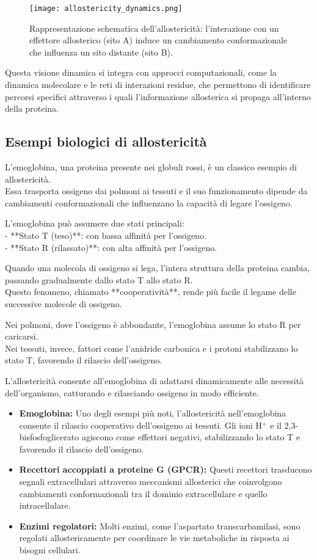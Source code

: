 \documentclass[Lau,binding=0.6cm,oneside,noexaminfo]{sapthesis}
\begin{document}
\begin{figure}[h!]
    \centering
    \texttt{[image: allostericity\_dynamics.png]}
    \caption{Rappresentazione schematica dell’allostericità: l’interazione con un effettore allosterico (sito A) induce un cambiamento conformazionale che influenza un sito distante (sito B).}
    \label{fig:allostericity}
\end{figure}

Questa visione dinamica si integra con approcci computazionali, come la dinamica molecolare e le reti di interazioni residue, che permettono di identificare percorsi specifici attraverso i quali l’informazione allosterica si propaga all’interno della proteina.

\subsection*{Esempi biologici di allostericità}
L’emoglobina, una proteina presente nei globuli rossi, è un classico esempio di allostericità. \\
Essa trasporta ossigeno dai polmoni ai tessuti e il suo funzionamento dipende da cambiamenti conformazionali che influenzano la capacità di legare l’ossigeno.

L’emoglobina può assumere due stati principali: \\
- **Stato T (teso)**: con bassa affinità per l’ossigeno. \\
- **Stato R (rilassato)**: con alta affinità per l’ossigeno.

Quando una molecola di ossigeno si lega, l’intera struttura della proteina cambia, passando gradualmente dallo stato T allo stato R. \\
Questo fenomeno, chiamato **cooperatività**, rende più facile il legame delle successive molecole di ossigeno.

Nei polmoni, dove l’ossigeno è abbondante, l’emoglobina assume lo stato R per caricarsi. \\
Nei tessuti, invece, fattori come l’anidride carbonica e i protoni stabilizzano lo stato T, favorendo il rilascio dell’ossigeno.

L’allostericità consente all’emoglobina di adattarsi dinamicamente alle necessità dell’organismo, catturando e rilasciando ossigeno in modo efficiente.
\begin{itemize}
    \item \textbf{Emoglobina:} Uno degli esempi più noti, l’allostericità nell’emoglobina consente il rilascio cooperativo dell’ossigeno ai tessuti. Gli ioni H\(^+\) e il 2,3-bisfosfoglicerato agiscono come effettori negativi, stabilizzando lo stato T e favorendo il rilascio dell’ossigeno.
    \item \textbf{Recettori accoppiati a proteine G (GPCR):} Questi recettori trasducono segnali extracellulari attraverso meccanismi allosterici che coinvolgono cambiamenti conformazionali tra il dominio extracellulare e quello intracellulare.
    \item \textbf{Enzimi regolatori:} Molti enzimi, come l’aspartato transcarbamilasi, sono regolati allostericamente per coordinare le vie metaboliche in risposta ai bisogni cellulari.
\end{itemize}
\end{document}
